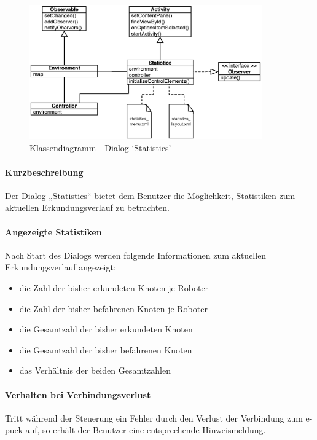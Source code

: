 \documentclass[10pt,a4paper]{article}
\begin{document}
	\begin{figure}[h]
			\centering
			\includegraphics[width=10cm]{images/entwurf_statistics.eps}
  			\caption{Klassendiagramm - Dialog `Statistics'}
  			\label{fig:dialog_statistics}
  	\end{figure}
	
	\paragraph*{Kurzbeschreibung} Der Dialog „Statistics“ bietet dem Benutzer die Möglichkeit, Statistiken zum aktuellen Erkundungsverlauf zu
	betrachten.
	
	\paragraph*{Angezeigte Statistiken} Nach Start des Dialogs werden folgende Informationen zum aktuellen Erkundungsverlauf angezeigt:
	\begin{itemize}
	\item die Zahl der bisher erkundeten Knoten je Roboter
	\item die Zahl der bisher befahrenen Knoten je Roboter
	\item die Gesamtzahl der bisher erkundeten Knoten
	\item die Gesamtzahl der bisher befahrenen Knoten
	\item das Verhältnis der beiden Gesamtzahlen
	\end{itemize}
	
	\paragraph*{Verhalten bei Verbindungsverlust} Tritt während der Steuerung ein Fehler durch den Verlust der Verbindung zum e-puck auf, so erhält
	 der Benutzer eine entsprechende Hinweismeldung.        
      		
\end{document}
